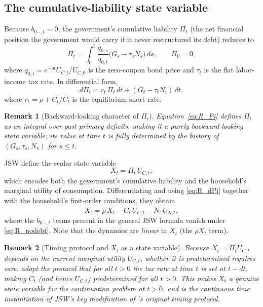 \documentclass[12pt]{article}
\newtheorem{remark}{Remark}
\begin{document}
\subsection{The cumulative-liability state variable}

Because $b_{0-,t} = 0$, the government's cumulative liability $\Pi_t$
(the net financial position the government would carry if it never restructured
its debt) reduces to
\begin{equation}\label{eq:R_Pi}
  \Pi_t = \int_0^t \frac{q_{0,s}}{q_{0,t}}\bigl(G_s - \tau_s N_s\bigr)\, ds,
  \qquad \Pi_0 = 0,
\end{equation}
where $q_{0,t} = e^{-\rho t} U_{C,t}/U_{C,0}$ is the zero-coupon bond price
and $\tau_t$ is the flat labor-income tax rate.  In differential form,
\begin{equation}\label{eq:R_dPi}
  d\Pi_t = r_t\,\Pi_t\, dt + (G_t - \tau_t N_t)\, dt,
\end{equation}
where $r_t = \rho + \dot{C}_t/C_t$ is the equilibrium short rate.

\begin{remark}[Backward-looking character of $\Pi_t$]
Equation~\eqref{eq:R_Pi} defines $\Pi_t$ as an integral over past primary deficits, making it a purely backward-looking state variable: its value at time $t$ is fully determined by the history of $(G_s, \tau_s, N_s)$ for $s \le t$.
\end{remark}

JSW define the scalar state variable
\begin{equation}\label{eq:R_Xt}
  X_t = \Pi_t\, U_{C,t},
\end{equation}
which encodes both the government's cumulative liability and the household's
marginal utility of consumption.  Differentiating and using \eqref{eq:R_dPi}
together with the household's first-order conditions, they obtain
\begin{equation}\label{eq:R_dXt}
  \dot{X}_t = \rho\, X_t - C_t\, U_{C,t} - N_t\, U_{N,t},
\end{equation}
where the $b_{0-,t}$ terms present in the general JSW formula vanish under
\eqref{eq:R_nodebt}.  Note that the dynamics are \emph{linear} in $X_t$ (the
$\rho X_t$ term).

\begin{remark}[Timing protocol and $X_t$ as a state variable]
Because $X_t = \Pi_t U_{C,t}$ depends on the current marginal utility $U_{C,t}$,
whether it is predetermined requires care.  \citet{JiangSargentWang2024} adopt
the protocol that for all $t >0$ the tax rate at time $t$ is set at $t-dt$, making $C_t$ (and
hence $U_{C,t}$) predetermined for all  $t>0$.  This makes $X_t$ a genuine state variable
for the continuation problem at $t >0$, and is the continuous time instantiation of JSW's key modification of
\citeauthor{LucasStokey1983}'s original timing protocol. 
\end{remark}
\end{document}
